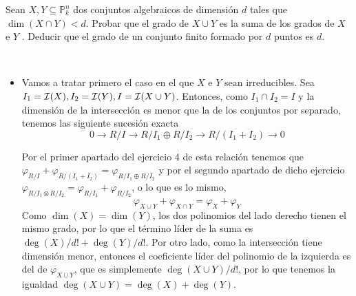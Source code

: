 \documentclass[twoside]{article}
\begin{document}
\newpage

\begin{ejercicio}{2}
 
Sean $X, Y ⊆ \mathbb{P}^n_k$
dos conjuntos algebraicos de dimensión $d$ tales
que $\dim(X ∩Y ) < d$. Probar que el grado de $X ∪Y$ es la suma de los grados de
$X$ e $Y$ . Deducir que el grado de un conjunto finito formado por $d$ puntos es $d$.
\end{ejercicio}

\begin{solucion}\
\begin{itemize}
\item Vamos a tratar primero el caso en el que $X$ e $Y$ sean irreducibles. Sea $I_1=\mathcal{I}(X),  I_2=\mathcal{I}(Y), I=\mathcal{I}(X\cup Y)$. Entonces, como $I_1\cap I_2=I$ y la dimensión de la intersección es menor que la de los conjuntos por separado, tenemos las siguiente sucesión exacta
\[
0\to R/I\to R/I_1\oplus R/I_2\to R/(I_1+I_2)\to 0
\]

Por el primer apartado del ejercicio 4 de esta relación tenemos que $\varphi_{R/I}+\varphi_{R/(I_1+I_2)}=\varphi_{R/I_1\oplus R/I_2}$ y por el segundo apartado de dicho ejercicio $\varphi_{R/I_1\otimes R/I_2}=\varphi_{R/I_1} + \varphi_{R/I_2}$, o lo que es lo mismo,
\[
\varphi_{X\cup Y}+\varphi_{X\cap Y}=\varphi_{X} + \varphi_{Y}
\]
Como $\dim(X)=\dim(Y)$, los dos polinomios del lado derecho tienen el mismo grado, por lo que el término líder de la suma es $\deg(X)/d!+\deg(Y)/d!$. Por otro lado, como la intersección tiene dimensión menor, entonces el coeficiente líder del polinomio de la izquierda es del de $\varphi_{X\cup Y}$, que es simplemente $\deg(X\cup Y)/d!$, por lo que tenemos la igualdad $\deg(X\cup Y)=\deg(X)+\deg(Y)$.



\end{itemize}
\end{solucion}
\end{document}
